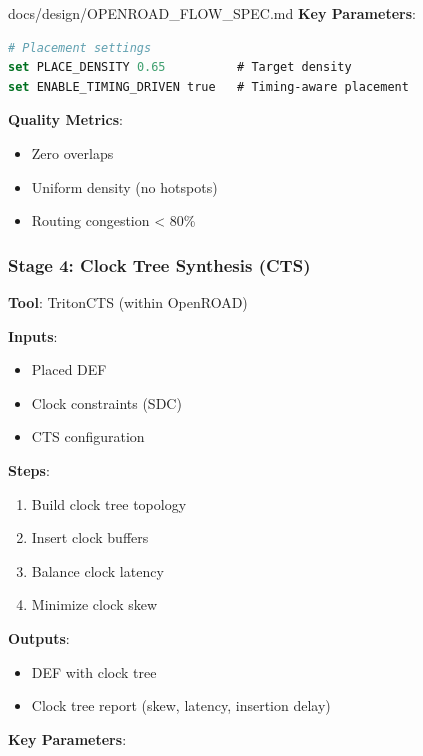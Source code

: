 \begin{relocated}{docs/design/OPENROAD_FLOW_SPEC.md}
\textbf{Key Parameters}:

\begin{lstlisting}[language=tcl]
# Placement settings
set PLACE_DENSITY 0.65          # Target density
set ENABLE_TIMING_DRIVEN true   # Timing-aware placement
\end{lstlisting}

\textbf{Quality Metrics}:

\begin{itemize}
\tightlist
\item
  Zero overlaps
\item
  Uniform density (no hotspots)
\item
  Routing congestion \textless{} 80\%
\end{itemize}

\subsubsection{Stage 4: Clock Tree Synthesis (CTS)}\label{tm:pd:openroad-flow:stage-4-clock-tree-synthesis-cts}

\textbf{Tool}: TritonCTS (within OpenROAD)

\textbf{Inputs}:

\begin{itemize}
\tightlist
\item
  Placed DEF
\item
  Clock constraints (SDC)
\item
  CTS configuration
\end{itemize}

\textbf{Steps}:

\begin{enumerate}
\def\labelenumi{\arabic{enumi}.}
\tightlist
\item
  Build clock tree topology
\item
  Insert clock buffers
\item
  Balance clock latency
\item
  Minimize clock skew
\end{enumerate}

\textbf{Outputs}:

\begin{itemize}
\tightlist
\item
  DEF with clock tree
\item
  Clock tree report (skew, latency, insertion delay)
\end{itemize}

\textbf{Key Parameters}:


\end{relocated}
